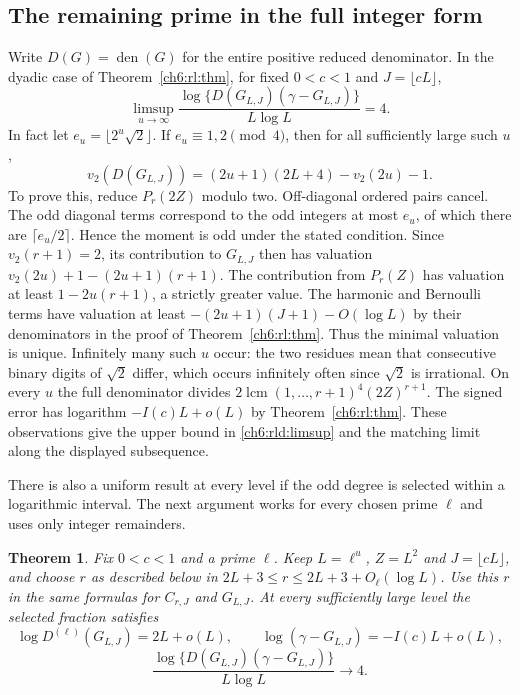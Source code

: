 \documentclass[11pt,a4paper,oneside,openany]{report}
\newtheorem{theorem}{Theorem}[section]
\theoremstyle{remark}\newtheorem{remark}[theorem]{Remark}
\numberwithin{equation}{section}
\begin{document}
\subsection{The remaining prime in the full integer form}
\label{ch6:rld:local}

Write $D(G)=\operatorname{den}(G)$ for the entire positive reduced
denominator. In the dyadic case of Theorem~\ref{ch6:rl:thm}, for fixed
$0<c<1$ and $J=\lfloor cL\rfloor$,
\begin{equation}\label{ch6:rld:limsup}
 \limsup_{u\to\infty}
 \frac{\log\{D(G_{L,J})(\gamma-G_{L,J})\}}{L\log L}=4 .
\end{equation}
In fact let $e_u=\lfloor2^u\sqrt2\rfloor$. If
$e_u\equiv1,2\pmod4$, then for all sufficiently large such $u$,
\[
 v_2(D(G_{L,J}))=(2u+1)(2L+4)-v_2(2u)-1 .
\]
To prove this, reduce $P_r(2Z)$ modulo two. Off-diagonal ordered
pairs cancel. The odd diagonal terms correspond to the odd integers
at most $e_u$, of which there are $\lceil e_u/2\rceil$. Hence the
moment is odd under the stated condition. Since $v_2(r+1)=2$,
its contribution to $G_{L,J}$ then has valuation
$v_2(2u)+1-(2u+1)(r+1)$.
The contribution from $P_r(Z)$ has valuation at least
$1-2u(r+1)$, a strictly greater value.
The harmonic and Bernoulli terms have valuation at least
$-(2u+1)(J+1)-O(\log L)$ by their denominators in the proof of
Theorem~\ref{ch6:rl:thm}. Thus the minimal valuation is unique.
Infinitely many such $u$ occur: the two residues mean that consecutive
binary digits of $\sqrt2$ differ, which occurs infinitely often since
$\sqrt2$ is irrational.
On every $u$ the full denominator divides
$2\operatorname{lcm}(1,\ldots,r+1)^4(2Z)^{r+1}$.
The signed error has logarithm $-I(c)L+o(L)$ by
Theorem~\ref{ch6:rl:thm}. These observations give the upper bound
in \eqref{ch6:rld:limsup} and the matching limit along the displayed
subsequence.

There is also a uniform result at every level if the odd degree is
selected within a logarithmic interval. The next argument works for
every chosen prime $\ell$ and uses only integer remainders.

\begin{theorem}\label{ch6:rld:window}
Fix $0<c<1$ and a prime $\ell$. Keep $L=\ell^u$, $Z=L^2$ and
$J=\lfloor cL\rfloor$, and choose $r$ as described below in
$2L+3\le r\le 2L+3+O_\ell(\log L)$.
Use this $r$ in the same formulas for $C_{r,J}$ and $G_{L,J}$.
At every sufficiently large level the selected fraction satisfies
\[
 \log D^{(\ell)}(G_{L,J})=2L+o(L),\qquad
 \log(\gamma-G_{L,J})=-I(c)L+o(L),
\]
\[
 \frac{\log\{D(G_{L,J})(\gamma-G_{L,J})\}}{L\log L}\longrightarrow4 .
\]
\end{theorem}
\end{document}
